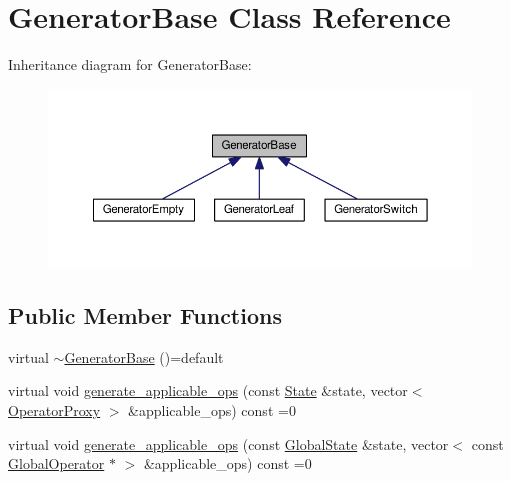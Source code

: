 \hypertarget{classGeneratorBase}{\section{Generator\-Base Class Reference}
\label{classGeneratorBase}
}


Inheritance diagram for Generator\-Base\-:
\nopagebreak
\begin{figure}[H]
\begin{center}
\leavevmode
\includegraphics[width=350pt]{classGeneratorBase__inherit__graph}
\end{center}
\end{figure}
\subsection*{Public Member Functions}
\begin{DoxyCompactItemize}
\item 
virtual \hyperlink{classGeneratorBase_a6359aca0713b427c7e455efe2bf7f0a3}{$\sim$\-Generator\-Base} ()=default
\item 
virtual void \hyperlink{classGeneratorBase_a5bc20f356babc6861a3a52fcd14c95a0}{generate\-\_\-applicable\-\_\-ops} (const \hyperlink{classState}{State} \&state, vector$<$ \hyperlink{classOperatorProxy}{Operator\-Proxy} $>$ \&applicable\-\_\-ops) const =0
\item 
virtual void \hyperlink{classGeneratorBase_aac7060bf6191abc9886d6a04ed1707d5}{generate\-\_\-applicable\-\_\-ops} (const \hyperlink{classGlobalState}{Global\-State} \&state, vector$<$ const \hyperlink{classGlobalOperator}{Global\-Operator} $\ast$ $>$ \&applicable\-\_\-ops) const =0
\end{DoxyCompactItemize}


